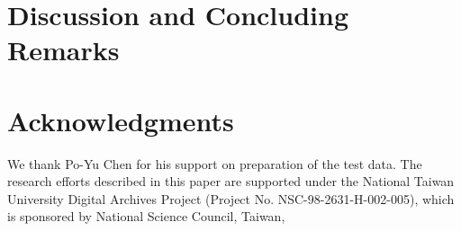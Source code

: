 \section{Discussion and Concluding Remarks}


\section{Acknowledgments}

We thank Po-Yu Chen for his support on preparation of the test data.  The
research efforts described in this paper are supported under the National Taiwan
University Digital Archives Project (Project No.  NSC-98-2631-H-002-005), which
is sponsored by National Science Council, Taiwan, 
